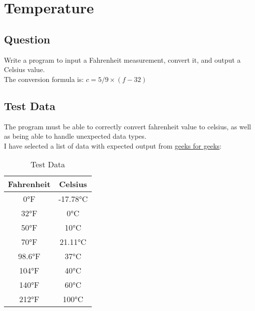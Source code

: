 \documentclass[main.tex]{subfiles}
\begin{document}
    \section{Temperature}
        \subsection{Question}
        Write a program to input a Fahrenheit measurement, convert it, and output a Celsius value.\\
        The conversion formula is: \(c = 5 / 9 \times (f - 32)\)

        \subsection{Test Data}
            The program must be able to correctly convert fahrenheit value to celsius,
            as well as being able to handle unexpected data types.\\

            I have selected a list of data with expected output from \href{https://www.geeksforgeeks.org/fahrenheit-to-celsius-formula/}{geeks for geeks}:
            \begin{table}[H]
                \centering
                \begin{tabular}{c c}
                    \hline
                    \textbf{Fahrenheit} & \textbf{Celsius} \\
                    \hline
                    0°F & -17.78°C \\
                    32°F & 0°C \\
                    50°F & 10°C \\
                    70°F & 21.11°C \\
                    98.6°F & 37°C \\
                    104°F & 40°C \\
                    140°F & 60°C \\
                    212°F & 100°C \\
                    \hline
                \end{tabular}
                \caption{Test Data}
            \end{table}
\end{document}
